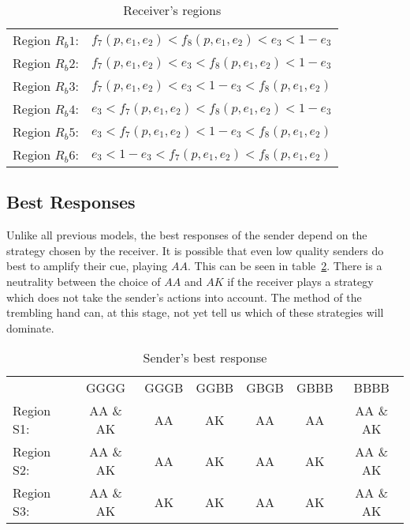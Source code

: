 \documentclass[a4paper,12pt]{article}
\numberwithin{equation}{section}
\renewcommand*{\arraystretch}{1.4}
\begin{document}
\begin{table}[h]
\begin{center}
\begin{tabular}{lc}
Region $R_{b}1$: & $f_{7}(p,e_{1},e_{2})<f_{8}(p,e_{1},e_{2})<e_{3}<1-e_{3}$\\
Region $R_{b}2$: & $f_{7}(p,e_{1},e_{2})<e_{3}<f_{8}(p,e_{1},e_{2})<1-e_{3}$\\
Region $R_{b}3$: & $f_{7}(p,e_{1},e_{2})<e_{3}<1-e_{3}<f_{8}(p,e_{1},e_{2})$\\
Region $R_{b}4$: & $e_{3}<f_{7}(p,e_{1},e_{2})<f_{8}(p,e_{1},e_{2})<1-e_{3}$\\
Region $R_{b}5$: & $e_{3}<f_{7}(p,e_{1},e_{2})<1-e_{3}<f_{8}(p,e_{1},e_{2})$\\
Region $R_{b}6$: & $e_{3}<1-e_{3}<f_{7}(p,e_{1},e_{2})<f_{8}(p,e_{1},e_{2})$
\end{tabular}
\end{center}
\caption{Receiver's regions}
\label{tab:CueGamewithObservableAmplification/RegionsRb}
\end{table}

\vspace{30mm}


\subsection{Best Responses}
\label{sec:Cue Game with Observable Amplification/Best Response}

Unlike all previous models, the best responses of the sender depend on the strategy chosen by the receiver. It is possible that even low quality senders do best to amplify their cue, playing $AA$. This can be seen in table~\ref{tab:CueGamewithObservableAmplification/BestResponseS}. There is a neutrality between the choice of $AA$ and $AK$ if the receiver plays a strategy which does not take the sender's actions into account. The method of the trembling hand can, at this stage, not yet tell us which of these strategies will dominate.

\begin{table}[h]
\renewcommand*{\arraystretch}{1.35}
\begin{center}
\begin{tabular}{lcccccc}
 & GGGG & GGGB & GGBB & GBGB & GBBB & BBBB\\
Region S1: & AA \& AK & AA & AK & AA & AA & AA \& AK\\
Region S2: & AA \& AK & AA & AK & AA & AK & AA \& AK\\
Region S3: & AA \& AK & AK & AK & AA & AK & AA \& AK
\end{tabular}
\end{center}
\caption{Sender's best response}
\label{tab:CueGamewithObservableAmplification/BestResponseS}
\end{table}
\end{document}
